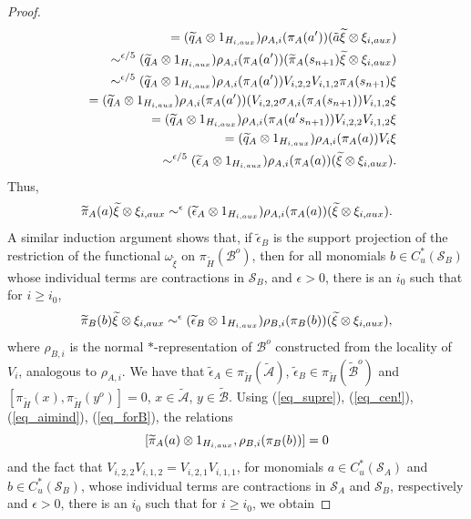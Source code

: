 \documentclass[10pt,a4paper]{amsart}
\newcommand{\cl}[1]{\mathcal{#1}}
\providecommand{\wt}[1]{\widetilde{#1}}
\begin{document}
\begin{proof}
\begin{eqnarray*}
 && =
 (\wt{q}_A\otimes 1_{H_{i,{\rm aux}}})\rho_{A,i}(\pi_A(a'))
 (\tilde a\wt{\xi}\otimes\xi_{i,{\rm aux}})\\
 && \sim^{\epsilon/5} 
 (\wt{q}_A\otimes 1_{H_{i,\rm aux}})\rho_{A,i}(\pi_A(a'))(\wt{\pi}_A(s_{n+1})\wt{\xi}\otimes\xi_{i,{\rm aux}})\\
 && \sim^{\epsilon/5}
 (\wt{q}_A\otimes 1_{H_{i,\rm aux}})\rho_{A,i}(\pi_A(a'))V_{i,2,2}V_{i,1,2}\pi_A(s_{n+1})\xi\\
 && =
 (\wt{q}_A\otimes 1_{H_{i,\rm aux}})\rho_{A,i}(\pi_A(a'))(V_{i,2,2}\sigma_{A,i}(\pi_A(s_{n+1}))V_{i,1,2}\xi\\
 && =
 (\wt{q}_A\otimes 1_{H_{i,{\rm aux}}})\rho_{A,i}(\pi_A(a's_{n+1}))V_{i,2,2}V_{i,1,2}\xi\\
 && =
 (\wt{q}_A\otimes 1_{H_{i,\rm aux}})\rho_{A,i}(\pi_A(a))V_i\xi\\
 && \sim^{\epsilon/5}
 (\wt{\epsilon}_A\otimes 1_{H_{i,{\rm aux}}})\rho_{A,i}(\pi_A(a))(\wt{\xi}\otimes\xi_{i, {\rm aux}}).
\end{eqnarray*}
Thus, 
$$\wt{\pi}_A(a)\wt{\xi}\otimes\xi_{i,{\rm aux}} 
\sim^{\epsilon} (\wt{\epsilon}_A\otimes 1_{H_{i,{\rm aux}}})
\rho_{A,i}(\pi_A(a))(\wt{\xi}\otimes\xi_{i,{\rm aux}}).$$
A similar induction argument shows that, 
if $\wt{\epsilon}_B$ is the support projection of the restriction of  
the functional $\omega_{\wt{\xi}}$ on $\pi_{\wt{H}}(\cl B^o)$, then for all monomials $b\in C_u^*(\cl S_B)$ whose individual terms are contractions in $\cl S_B$, and $\epsilon>0$, there is an $i_0$ such that for $i\geq i_0$,
\begin{equation}\label{eq_forB}
\wt{\pi}_B(b)\wt{\xi}\otimes\xi_{i,{\rm aux}}
\sim^{\epsilon} 
(\wt{\epsilon}_B\otimes 1_{H_{i,{\rm aux}}})\rho_{B,i}(\pi_B(b))(\wt{\xi}\otimes\xi_{i,{\rm aux}}),
\end{equation}
where $\rho_{B,i}$ is the normal $*$-representation of $\cl B^o$ constructed from the locality of $V_i$, analogous to $\rho_{A,i}$.
We have that 
$\wt{\epsilon}_A\in \pi_{\wt{H}}(\wt{\cl A})$, $\wt{\epsilon}_B\in \pi_{\wt{H}}(\wt{\cl B}^o)$ and $[\pi_{\wt{H}}(x), \pi_{\wt{H}}(y^o)]=0$, $x\in \wt{\cl A}$, $y\in\wt{\cl B}$.
Using (\ref{eq_supre}), (\ref{eq_cen!}),  (\ref{eq_aimind}), (\ref{eq_forB}), the relations
$$[\wt{\pi}_A(a)\otimes 1_{H_{i,\rm aux}},\rho_{B,i}(\pi_{B}(b))] = 0$$ 
and the fact that $V_{i,2,2}V_{i,1,2} = V_{i,2,1}V_{i,1,1}$, 
for monomials $a\in C_u^*(\cl S_A)$ and $b\in C_u^*(\cl S_B)$, whose individual terms are contractions in $\cl S_A$ and $\cl S_B$, respectively and $\epsilon>0$, there is an $i_0$ such that for $i\geq i_0$, we obtain 

\end{proof}
\end{document}
